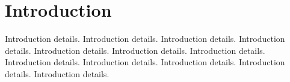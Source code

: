 
\section{Introduction}




Introduction details. Introduction details. Introduction details. Introduction details. Introduction details. Introduction details. Introduction details. Introduction details. Introduction details. Introduction details. Introduction details. Introduction details. 



